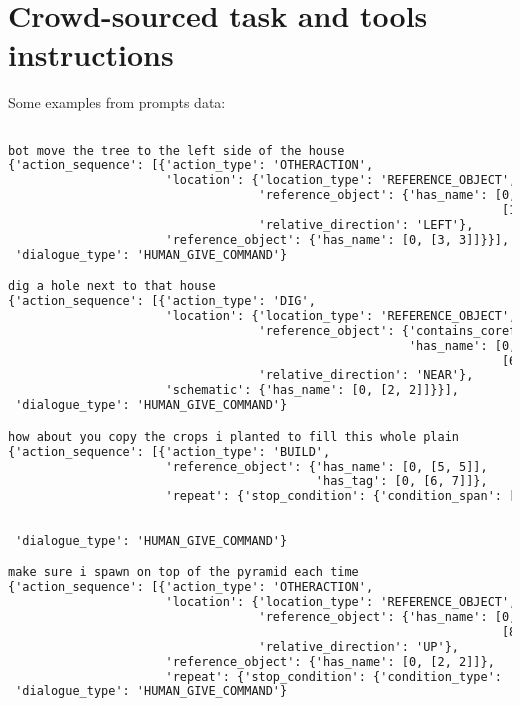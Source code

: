 \clearpage
\onecolumn
\lstset{
basicstyle=\small\ttfamily,
columns=flexible,
breaklines=true
}

\section{Crowd-sourced task and tools instructions}
\label{sec:dataset_examples}

Some examples from prompts data:

\begin{lstlisting}[language=TeX]

bot move the tree to the left side of the house
{'action_sequence': [{'action_type': 'OTHERACTION',
                      'location': {'location_type': 'REFERENCE_OBJECT',
                                   'reference_object': {'has_name': [0,
                                                                     [10, 10]]},
                                   'relative_direction': 'LEFT'},
                      'reference_object': {'has_name': [0, [3, 3]]}}],
 'dialogue_type': 'HUMAN_GIVE_COMMAND'}

dig a hole next to that house
{'action_sequence': [{'action_type': 'DIG',
                      'location': {'location_type': 'REFERENCE_OBJECT',
                                   'reference_object': {'contains_coreference': 'yes',
                                                        'has_name': [0,
                                                                     [6, 6]]},
                                   'relative_direction': 'NEAR'},
                      'schematic': {'has_name': [0, [2, 2]]}}],
 'dialogue_type': 'HUMAN_GIVE_COMMAND'}

how about you copy the crops i planted to fill this whole plain
{'action_sequence': [{'action_type': 'BUILD',
                      'reference_object': {'has_name': [0, [5, 5]],
                                           'has_tag': [0, [6, 7]]},
                      'repeat': {'stop_condition': {'condition_span': [0,
                                                                       [9,
                                                                        12]]}}}],
 'dialogue_type': 'HUMAN_GIVE_COMMAND'}

make sure i spawn on top of the pyramid each time
{'action_sequence': [{'action_type': 'OTHERACTION',
                      'location': {'location_type': 'REFERENCE_OBJECT',
                                   'reference_object': {'has_name': [0,
                                                                     [8, 8]]},
                                   'relative_direction': 'UP'},
                      'reference_object': {'has_name': [0, [2, 2]]},
                      'repeat': {'stop_condition': {'condition_type': 'NEVER'}}}],
 'dialogue_type': 'HUMAN_GIVE_COMMAND'}


\end{lstlisting}
